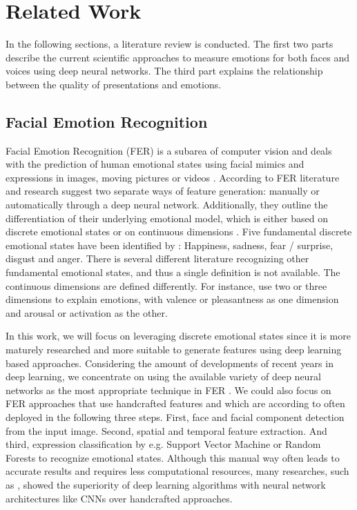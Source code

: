 \section{Related Work}
\label{sec:related_work}
In the following sections, a literature review is conducted. The first two parts describe the current scientific approaches to measure emotions for both faces and voices using deep neural networks. The third part explains the relationship between the quality of presentations and emotions.

\subsection{Facial Emotion Recognition}
\label{subsec:related_work_facial_emotion_recognition}
Facial Emotion Recognition (FER) is a subarea of computer vision and deals with the prediction of human emotional states using facial mimics and expressions in images, moving pictures or videos \cite{jain_extended_2019}.
According to  FER literature and research suggest two separate ways of feature generation: manually or automatically through a deep neural network. Additionally, they outline the differentiation of their underlying emotional model, which is either based on discrete emotional states or on continuous dimensions \cite{rosler_reducing_2021}. Five fundamental discrete emotional states have been identified by : Happiness, sadness, fear / surprise, disgust and anger. There is several different literature recognizing other fundamental emotional states, and thus a single definition is not available. The continuous dimensions are defined differently. For instance,  use two or three dimensions to explain emotions, with valence or pleasantness as one dimension and arousal or activation as the other.

In this work, we will focus on leveraging discrete emotional states since it is more maturely researched and more suitable to generate features using deep learning based approaches. Considering the amount of developments of recent years in deep learning, we concentrate on using the available variety of deep neural networks as the most appropriate technique in FER \cite{jain_extended_2019}. We could also focus on FER approaches that use handcrafted features and which are according to  often deployed in the following three steps. First, face and facial component detection from the input image. Second, spatial and temporal feature extraction. And third, expression classification by e.g. Support Vector Machine or Random Forests to recognize emotional states. Although this manual way often leads to accurate results and requires less computational resources, many researches, such as , showed the superiority of deep learning algorithms with neural network architectures like CNNs over handcrafted approaches.

